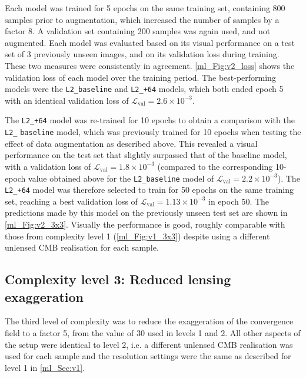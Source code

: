 Each model was trained for 5 epochs on the same training set, containing 800 samples prior to augmentation, which increased the number of samples by a factor 8. A validation set containing 200 samples was again used, and not augmented. Each model was evaluated based on its visual performance on a test set of 3 previously unseen images, and on its validation loss during training. These two measures were consistently in agreement. \autoref{ml_Fig:v2_loss} shows the validation loss of each model over the training period. The best-performing models were the \texttt{L2\_baseline} and \texttt{L2\_+64} models, which both ended epoch 5 with an identical validation loss of $\mathcal{L}_\text{val} = 2.6 \times 10^{-3}$.

The \texttt{L2\_+64} model was re-trained for 10 epochs to obtain a comparison with the \texttt{L2\_} \texttt{baseline} model, which was previously trained for 10 epochs when testing the effect of data augmentation as described above. This revealed a visual performance on the test set that slightly surpassed that of the baseline model, with a validation loss of $\mathcal{L}_\text{val} = 1.8 \times 10^{-3}$ (compared to the corresponding 10-epoch value obtained above for the \texttt{L2\_baseline} model of $\mathcal{L}_\text{val} = 2.2 \times 10^{-3}$). The \texttt{L2\_+64} model was therefore selected to train for 50 epochs on the same training set, reaching a best validation loss of $\mathcal{L}_\text{val} = 1.13 \times 10^{-3}$ in epoch 50. The predictions made by this model on the previously unseen test set are shown in \autoref{ml_Fig:v2_3x3}. Visually the performance is good, roughly comparable with those from complexity level 1 (\autoref{ml_Fig:v1_3x3}) despite using a different unlensed CMB realisation for each sample.

\subsection{Complexity level 3: Reduced lensing exaggeration}
\label{ml_Sec:v3}

The third level of complexity was to reduce the exaggeration of the convergence field to a factor 5, from the value of 30 used in levels 1 and 2. All other aspects of the setup were identical to level 2, i.e. a different unlensed CMB realisation was used for each sample and the resolution settings were the same as described for level 1 in \autoref{ml_Sec:v1}.

